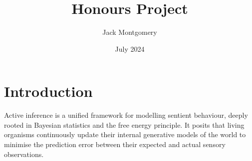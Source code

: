 \documentclass{article}
\title{Honours Project}
\author{Jack Montgomery}
\date{July 2024}
\begin{document}
\maketitle

\section{Introduction}

Active inference is a unified framework for modelling sentient behaviour, deeply rooted in Bayesian statistics and the free energy principle. It posits that living organisms continuously update their internal generative models of the world to minimise the prediction error between their expected and actual sensory observations. \citep{smith2022}



\end{document}
